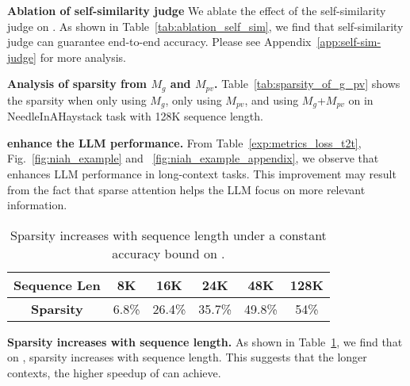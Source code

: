 \textbf{Ablation of self-similarity judge}\label{sec:judge}
We ablate the effect of the self-similarity judge on \mochi. As shown in Table~\ref{tab:ablation_self_sim}, we find that self-similarity judge can guarantee end-to-end accuracy.
Please see Appendix~\ref{app:self-sim-judge} for more analysis.


\textbf{Analysis of sparsity from $M_g$ and $M_{pv}$.} 
Table~\ref{tab:sparsity_of_g_pv} shows the sparsity when only using $M_g$, only using $M_{pv}$, and using $M_g$+$M_{pv}$ on \llamal in NeedleInAHaystack task with 128K sequence length. 

\textbf{\our enhance the LLM performance.} From Table~\ref{exp:metrics_loss_t2t}, Fig.~\ref{fig:niah_example} and ~\ref{fig:niah_example_appendix}, we observe that \our enhances LLM performance in long-context tasks. This improvement may result from the fact that sparse attention helps the LLM focus on more relevant information.

\begin{table}[h!]
\small
    \centering
    \caption{Sparsity increases with sequence length under a constant accuracy bound on \llamal.}
    \label{tab:sparsity_with_seqlen}
        \centering
        \setlength\tabcolsep{5.7pt}
        \begin{tabular}{c|c|c|c|c|c}
            \toprule
            \textbf{Sequence Len} & 8K & 16K & 24K & 48K & 128K  \\
            \midrule
            \textbf{Sparsity} & 6.8\% & 26.4\% & 35.7\% & 49.8\% & 54\% \\
            \bottomrule
        \end{tabular}
    \vspace{-.7em}
\end{table}


\textbf{Sparsity increases with sequence length.} As shown in Table~\ref{tab:sparsity_with_seqlen}, we find that on \llamal, sparsity increases with sequence length. This suggests that the longer contexts, the higher speedup of \our can achieve. \vspace{-.15em}

